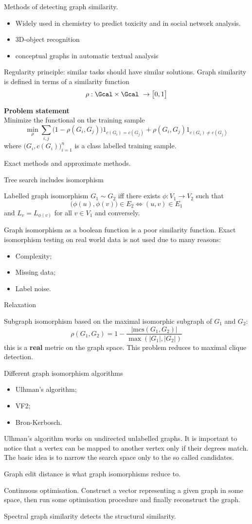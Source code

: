 Methods of detecting graph similarity.

\begin{itemize}
	\item Widely used in chemistry to predict toxicity and in social network analysis.
	\item 3D-object recognition
	\item conceptual graphs in automatic textual analysis
\end{itemize}

Regularity principle: similar tasks should have similar solutions.
Graph similarity is defined in terms of a similarity function
\[\rho:\Gcal\times \Gcal\ \to \big[0,1\big]\]

\noindent\textbf{Problem statement} \hfill\\
Minimize the functional on the training sample
\[\min_\rho \sum_{i,j} \big(1-\rho(G_i,G_j)\big) 1_{c(G_i)=c(G_j)} + \rho(G_i, G_j) 1_{c(G_i)\neq c(G_j)} \]
where $\big( G_i, c(G_i)\big)_{i=1}^n$ is a class labelled training sample.

Exact methods and approximate methods.

Tree search includes isomorphism

Labelled graph isomorphism $G_1\sim G_2$ iff there exists $\phi:V_1\to V_2$ such that 
\[ \big(\phi(u),\phi(v)\big)\in E_2 \Leftrightarrow (u,v)\in E_1\]
and $L_v = L_{\phi(v)}$ for all $v\in V_1$ and conversely.

Graph isomorphism as a boolean function is a poor similarity function.
Exact isomorphism testing on real world data is not used due to many reasons: \begin{itemize}
	\item Complexity;
	\item Missing data;
	\item Label noise.
\end{itemize}

Relaxation

Subgraph isomorphism based on the maximal isomorphic subgraph of $G_1$ and $G_2$:
\[\rho(G_1,G_2) = 1 - \frac{\lvert\text{mcs}(G_1, G_2)\rvert}{\max(|G_1|,|G_2|)}\]
this is a \textbf{real} metric on the graph space. This problem reduces to maximal clique detection.

Different graph isomorphism algorithms \begin{itemize}
	\item Ulhman's algorithm;
	\item VF2;
	\item Bron-Kerbosch.
\end{itemize}

Ulhman's algorithm works on undirected unlabelled graphs.
It is important to notice that a vertex can be mapped to another vertex only if their degrees match.
The basic idea is to narrow the search space only to the so called candidates.

Graph edit distance is what graph isomorphisms reduce to.

Continuous optimisation. Construct a vector representing a given graph in some space, then run some optimisation procedure and finally reconstruct the graph.

Spectral graph similarity detects the structural similarity.


